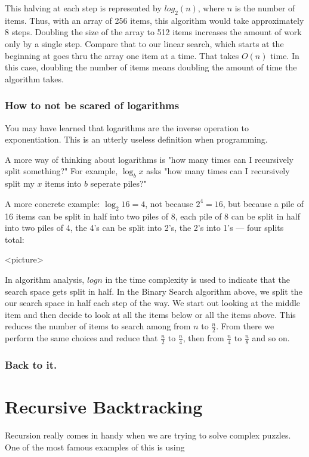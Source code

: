 This halving at each step is represented by $log_2(n)$, where $n$ is the number of items.  Thus, with an array of 256 items, this algorithm would take approximately 8 steps. Doubling the size of the array to 512 items increases the amount of work only by a single step.   Compare that to our linear search, which starts at the beginning at goes thru the array one item at a time.  That takes $O(n)$ time.  In this case, doubling the number of items means doubling the amount of time the algorithm takes.





\subsubsection{How to not be scared of logarithms }
You may have learned that logarithms are the inverse operation to exponentiation.
This is an utterly useless definition when programming.


A more way of thinking about logarithms is "how many times can I recursively split something?"
For example, $\log_b x$ asks "how many times can I recursively split my $x$ items into $b$ seperate piles?"

A more concrete example: $\log_2 16 = 4$, not because $2^4 = 16$, but because a pile of 16 items can be split in half into two piles of 8, each pile of 8 can be split in half into two piles of 4, the 4's can be split into 2's, the 2's into 1's --- four splits total:

<picture>


In algorithm analysis, $log n$ in the time complexity is used to indicate that the search space gets split in half.
In the Binary Search algorithm above, we split the our search space in half each step of the way.  We start out looking at the middle item and then decide to look at all the items below or all the items above.  This reduces the number of items to search among from $n$ to $\frac{n}{2}$.  From there we perform the same choices and reduce that $\frac{n}{2}$ to $\frac{n}{4}$, then from  $\frac{n}{4}$ to  $\frac{n}{8}$ and so on.

\subsubsection{Back to it.}

\section{Recursive Backtracking}
Recursion really comes in handy when we are trying to solve complex puzzles.
One of the most famous examples of this is using

